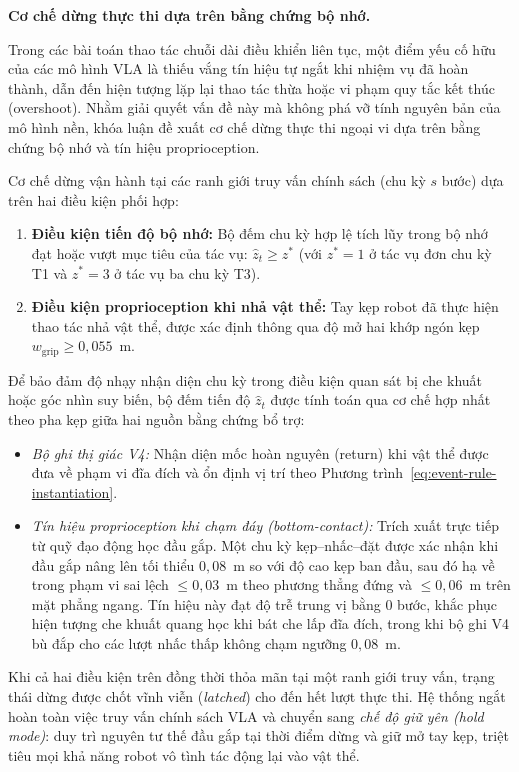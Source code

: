 \label{sec:method-memory-halt}
\textbf{Cơ chế dừng thực thi dựa trên bằng chứng bộ nhớ.}

Trong các bài toán thao tác chuỗi dài điều khiển liên tục, một điểm yếu cố hữu của các mô hình VLA là thiếu vắng tín hiệu tự ngắt khi nhiệm vụ đã hoàn thành, dẫn đến hiện tượng lặp lại thao tác thừa hoặc vi phạm quy tắc kết thúc (overshoot). Nhằm giải quyết vấn đề này mà không phá vỡ tính nguyên bản của mô hình nền, khóa luận đề xuất cơ chế dừng thực thi ngoại vi dựa trên bằng chứng bộ nhớ và tín hiệu proprioception.

Cơ chế dừng vận hành tại các ranh giới truy vấn chính sách (chu kỳ $s$ bước) dựa trên hai điều kiện phối hợp:
\begin{enumerate}
    \item \textbf{Điều kiện tiến độ bộ nhớ:} Bộ đếm chu kỳ hợp lệ tích lũy trong bộ nhớ đạt hoặc vượt mục tiêu của tác vụ: $\hat z_t \ge z^*$ (với $z^* = 1$ ở tác vụ đơn chu kỳ T1 và $z^* = 3$ ở tác vụ ba chu kỳ T3).
    \item \textbf{Điều kiện proprioception khi nhả vật thể:} Tay kẹp robot đã thực hiện thao tác nhả vật thể, được xác định thông qua độ mở hai khớp ngón kẹp $w_{\mathrm{grip}} \ge 0{,}055$~m.
\end{enumerate}

Để bảo đảm độ nhạy nhận diện chu kỳ trong điều kiện quan sát bị che khuất hoặc góc nhìn suy biến, bộ đếm tiến độ $\hat z_t$ được tính toán qua cơ chế hợp nhất theo pha kẹp giữa hai nguồn bằng chứng bổ trợ:
\begin{itemize}
    \item \textit{Bộ ghi thị giác V4:} Nhận diện mốc hoàn nguyên (return) khi vật thể được đưa về phạm vi đĩa đích và ổn định vị trí theo Phương trình~\eqref{eq:event-rule-instantiation}.
    \item \textit{Tín hiệu proprioception khi chạm đáy (bottom-contact):} Trích xuất trực tiếp từ quỹ đạo động học đầu gắp. Một chu kỳ kẹp--nhấc--đặt được xác nhận khi đầu gắp nâng lên tối thiểu $0{,}08$~m so với độ cao kẹp ban đầu, sau đó hạ về trong phạm vi sai lệch $\le 0{,}03$~m theo phương thẳng đứng và $\le 0{,}06$~m trên mặt phẳng ngang. Tín hiệu này đạt độ trễ trung vị bằng 0 bước, khắc phục hiện tượng che khuất quang học khi bát che lấp đĩa đích, trong khi bộ ghi V4 bù đắp cho các lượt nhấc thấp không chạm ngưỡng $0{,}08$~m.
\end{itemize}

Khi cả hai điều kiện trên đồng thời thỏa mãn tại một ranh giới truy vấn, trạng thái dừng được chốt vĩnh viễn (\textit{latched}) cho đến hết lượt thực thi. Hệ thống ngắt hoàn toàn việc truy vấn chính sách VLA và chuyển sang \textit{chế độ giữ yên (hold mode)}: duy trì nguyên tư thế đầu gắp tại thời điểm dừng và giữ mở tay kẹp, triệt tiêu mọi khả năng robot vô tình tác động lại vào vật thể.

